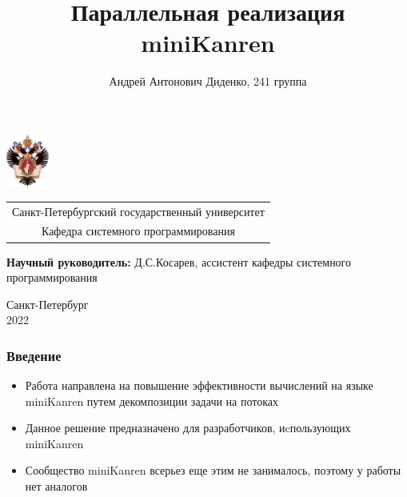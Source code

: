 \documentclass{beamer}
\title[Параллелизация miniKanren]{Параллельная реализация miniKanren}
\institute[СПбГУ]{}
\author[Андрей Диденко]{Андрей Антонович Диденко, 241 группа}
\begin{document}
{
\begin{frame}
  \includegraphics[width=1.4cm]{pictures/SPbGU_Logo.png}
  \vspace{-35pt}
  \hspace{-10pt}
  \begin{center}
    \begin{tabular}{c}
      \scriptsize{Санкт-Петербургский государственный университет} \\
      \scriptsize{Кафедра системного программирования}
    \end{tabular}
    \titlepage
  \end{center}

  \btVFill

  {\scriptsize
    {\bfseries Научный руководитель:} Д.С.Косарев, ассистент кафедры системного программирования \\
  }
  \begin{center}
    \vspace{5pt}
    \scriptsize{Санкт-Петербург\\
      2022}
  \end{center}

\end{frame}
}

\begin{frame}[fragile]
  \frametitle{Введение}
  \begin{itemize}
    \item Работа направлена на повышение эффективности вычислений на языке miniKanren путем декомпозиции задачи на потоках
    \item Данное решение предназначено для разработчиков, иcпользующих miniKanren
    \item Сообщество miniKanren всерьез еще этим не занималось, поэтому у работы нет аналогов
  \end{itemize}
\end{frame}
\end{document}
